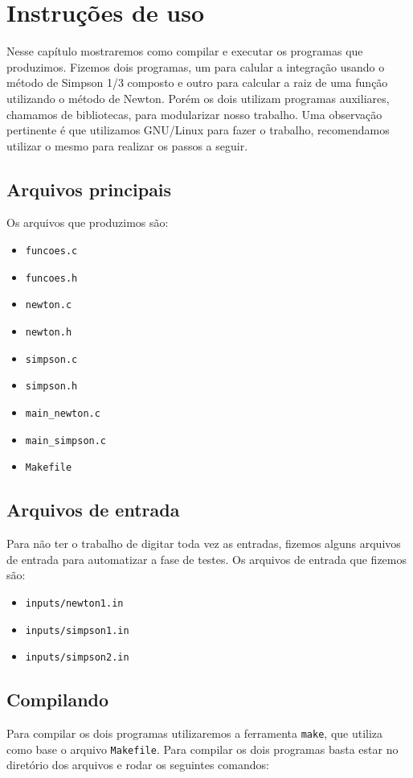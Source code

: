 \chapter{Instruções de uso}
Nesse capítulo mostraremos como compilar e executar os programas que produzimos.
Fizemos dois programas, um para calular a integração usando o método de Simpson
1/3 composto e outro para calcular a raiz de uma função utilizando o método de
Newton. Porém os dois utilizam programas auxiliares, chamamos de bibliotecas,
para modularizar nosso trabalho. Uma observação pertinente é que utilizamos GNU/Linux para fazer o trabalho, recomendamos utilizar o mesmo para realizar os passos a seguir.

\section{Arquivos principais}
Os arquivos que produzimos são:
\begin{multicols}{2}
	\begin{itemize}
		\item \texttt{funcoes.c}
		\item \texttt{funcoes.h}
		\item \texttt{newton.c}
		\item \texttt{newton.h}
		\item \texttt{simpson.c}
		\item \texttt{simpson.h}
		\item \texttt{main\_newton.c}
		\item \texttt{main\_simpson.c}
		\item \texttt{Makefile}
	\end{itemize}
\end{multicols}

\section{Arquivos de entrada}
Para não ter o trabalho de digitar toda vez as entradas, fizemos alguns arquivos de entrada para automatizar a fase de testes. Os arquivos de entrada que fizemos são:
\begin{itemize}
	\item \texttt{inputs/newton1.in}
	\item \texttt{inputs/simpson1.in}
	\item \texttt{inputs/simpson2.in}
\end{itemize}

\section{Compilando}
Para compilar os dois programas utilizaremos a ferramenta \texttt{make}, que
utiliza como base o arquivo \texttt{Makefile}. Para compilar os dois programas
basta estar no diretório dos arquivos e rodar os seguintes comandos:

